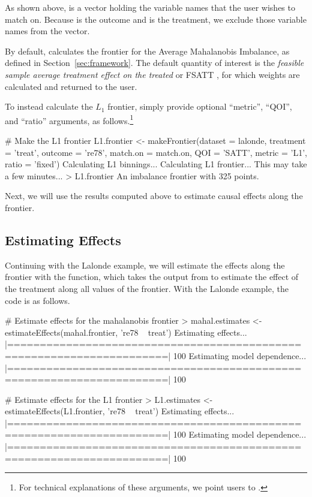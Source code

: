 \documentclass[nojss]{jss}
\begin{document}
As shown above,  is a vector holding the variable names
that the user wishes to match on. Because  is
the outcome and  is the treatment, we exclude those
variable names from the vector.

By default,  calculates the frontier for the
Average Mahalanobis Imbalance, as defined in
Section~\ref{sec:framework}.  The default quantity of interest is the
\emph{feasible sample average treatment effect on the treated} or
FSATT \citep{kingND}, for which weights are calculated and returned to the
user. 

To instead calculate the $L_1$ frontier, simply
provide optional ``metric'', ``QOI'', and ``ratio'' arguments, as
follows.\footnote{For technical explanations of these arguments, we
  point users to \citet{kingND}.}

\begin{CodeChunk}
\begin{CodeInput}
# Make the L1 frontier
L1.frontier <- makeFrontier(dataset = lalonde, 
                            treatment = 'treat', 
                            outcome = 're78', 
                            match.on = match.on,
                            QOI = 'SATT',
                            metric = 'L1',
                            ratio = 'fixed')
Calculating L1 binnings...
Calculating L1 frontier... This may take a few minutes...
> L1.frontier
An imbalance frontier with 325 points.
\end{CodeInput}
\end{CodeChunk}

Next, we will use the results computed above to estimate causal
effects along the frontier.

\subsection{Estimating Effects}

Continuing with the Lalonde example, we will estimate the effects
along the frontier with the  function, which
takes the output from  to estimate the effect of
the treatment along all values of the frontier. With the Lalonde
example, the code is as follows.

\begin{CodeChunk}
\begin{CodeInput}
# Estimate effects for the mahalanobis frontier
> mahal.estimates <- estimateEffects(mahal.frontier, 're78 ~ treat')
Estimating effects...
  |======================================================================| 100%
Estimating model dependence...
  |======================================================================| 100%

# Estimate effects for the L1 frontier
> L1.estimates <- estimateEffects(L1.frontier, 're78 ~ treat')
Estimating effects...
  |======================================================================| 100%
Estimating model dependence...
  |======================================================================| 100%
\end{CodeInput}
\end{CodeChunk}
\end{document}
